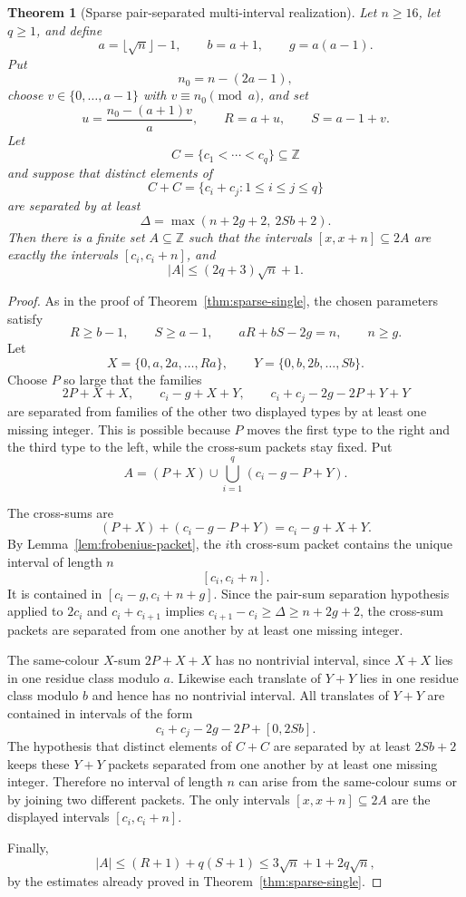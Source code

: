 \documentclass[11pt]{article}
\newtheorem{theorem}{Theorem}
\newcommand{\Z}{\mathbb{Z}}
\begin{document}
\begin{theorem}[Sparse pair-separated multi-interval realization]
\label{thm:sparse-pair-separated}
Let $n\geq 16$, let $q\geq 1$, and define
\[
 a=\lfloor\sqrt n\rfloor-1,\qquad b=a+1,\qquad g=a(a-1).
\]
Put
\[
 n_0=n-(2a-1),
\]
choose $v\in\{0,\ldots,a-1\}$ with $v\equiv n_0\pmod a$, and set
\[
 u=\frac{n_0-(a+1)v}{a},\qquad R=a+u,\qquad S=a-1+v.
\]
Let
\[
 C=\{c_1<\cdots<c_q\}\subseteq\Z
\]
and suppose that distinct elements of
\[
 C+C=\{c_i+c_j:1\leq i\leq j\leq q\}
\]
are separated by at least
\[
 \Delta=\max(n+2g+2,\ 2Sb+2).
\]
Then there is a finite set $A\subseteq\Z$ such that the intervals
$[x,x+n]\subseteq 2A$ are exactly the intervals $[c_i,c_i+n]$, and
\[
 |A|\leq (2q+3)\sqrt n+1.
\]
\end{theorem}

\begin{proof}
As in the proof of Theorem~\ref{thm:sparse-single}, the chosen parameters
satisfy
\[
 R\geq b-1,\qquad S\geq a-1,\qquad aR+bS-2g=n,\qquad n\geq g.
\]
Let
\[
 X=\{0,a,2a,\ldots,Ra\},\qquad
 Y=\{0,b,2b,\ldots,Sb\}.
\]
Choose $P$ so large that the families
\[
 2P+X+X,\qquad c_i-g+X+Y,\qquad
 c_i+c_j-2g-2P+Y+Y
\]
are separated from families of the other two displayed types by at least one
missing integer. This is possible because $P$ moves the first type to the
right and the third type to the left, while the cross-sum packets stay fixed.
Put
\[
 A=(P+X)\cup\bigcup_{i=1}^q(c_i-g-P+Y).
\]

The cross-sums are
\[
 (P+X)+(c_i-g-P+Y)=c_i-g+X+Y.
\]
By Lemma~\ref{lem:frobenius-packet}, the $i$th cross-sum packet contains the
unique interval of length $n$
\[
 [c_i,c_i+n].
\]
It is contained in $[c_i-g,c_i+n+g]$. Since the pair-sum separation hypothesis
applied to $2c_i$ and $c_i+c_{i+1}$ implies
$c_{i+1}-c_i\geq\Delta\geq n+2g+2$, the cross-sum packets are separated from
one another by at least one missing integer.

The same-colour $X$-sum $2P+X+X$ has no nontrivial interval, since $X+X$ lies
in one residue class modulo $a$. Likewise each translate of $Y+Y$ lies in one
residue class modulo $b$ and hence has no nontrivial interval. All translates
of $Y+Y$ are contained in intervals of the form
\[
 c_i+c_j-2g-2P+[0,2Sb].
\]
The hypothesis that distinct elements of $C+C$ are separated by at least
$2Sb+2$ keeps these $Y+Y$ packets separated from one another by at least one
missing integer. Therefore no interval of length $n$ can arise from the
same-colour sums or by joining two different packets. The only intervals
$[x,x+n]\subseteq 2A$ are the displayed intervals $[c_i,c_i+n]$.

Finally,
\[
 |A|\leq (R+1)+q(S+1)\leq 3\sqrt n+1+2q\sqrt n,
\]
by the estimates already proved in Theorem~\ref{thm:sparse-single}.
\end{proof}
\end{document}
